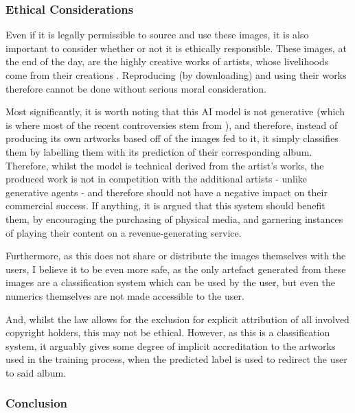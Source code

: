               \subsubsection{Ethical Considerations}
    
                  Even if it is legally permissible to source and use these images, it is also important to consider whether or not it is ethically responsible. These images, at the end of the day, are the highly creative works of artists, whose livelihoods come from their creations \cite{heikkila2022ai_art}. Reproducing (by downloading) and using their works therefore cannot be done without serious moral consideration.
    
                  Most significantly, it is worth noting that this AI model is not generative (which is where most of the recent controversies stem from \cite{apnews2025mccartney_ai_warning}), and therefore, instead of producing its own artworks based off of the images fed to it, it simply classifies them by labelling them with its prediction of their corresponding album. Therefore, whilst the model is technical derived from the artist's works, the produced work is not in competition with the additional artists - unlike generative agents \cite{times2025photographer_ai_copy} - and therefore should not have a negative impact on their commercial success. If anything, it is argued that this system should benefit them, by encouraging the purchasing of physical media, and garnering instances of playing their content on a revenue-generating service.
    
                  Furthermore, as this does not share or distribute the images themselves with the users, I believe it to be even more safe, as the only artefact generated from these images are a classification system which can be used by the user, but even the numerics themselves are not made accessible to the user.
    
                  And, whilst the law allows for the exclusion for explicit attribution of all involved copyright holders, this may not be ethical. However, as this is a classification system, it arguably gives some degree of implicit accreditation to the artworks used in the training process, when the predicted label is used to redirect the user to said album.
    
              \subsubsection{Conclusion}
    
